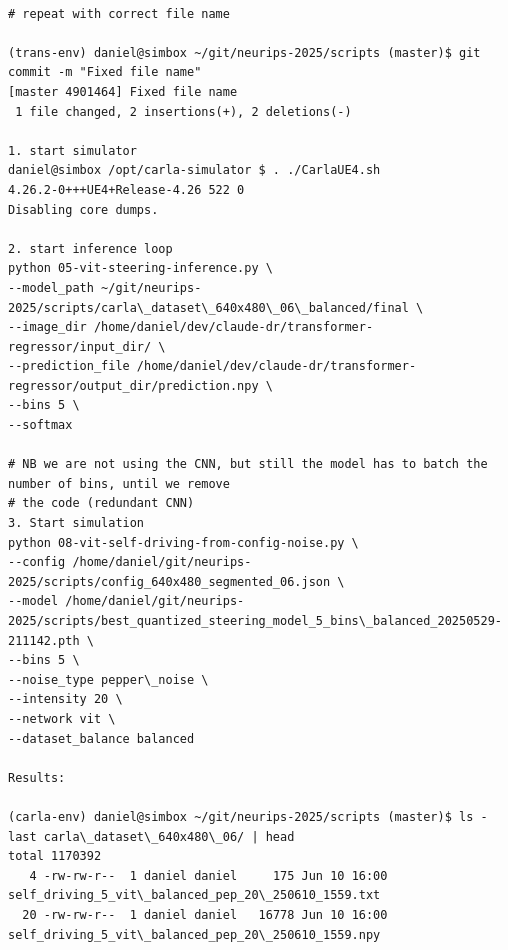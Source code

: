 \begin{verbatim}

# repeat with correct file name

(trans-env) daniel@simbox ~/git/neurips-2025/scripts (master)$ git commit -m "Fixed file name"
[master 4901464] Fixed file name
 1 file changed, 2 insertions(+), 2 deletions(-)
 
1. start simulator
daniel@simbox /opt/carla-simulator $ . ./CarlaUE4.sh 
4.26.2-0+++UE4+Release-4.26 522 0
Disabling core dumps.

2. start inference loop
python 05-vit-steering-inference.py \
--model_path ~/git/neurips-2025/scripts/carla\_dataset\_640x480\_06\_balanced/final \
--image_dir /home/daniel/dev/claude-dr/transformer-regressor/input_dir/ \
--prediction_file /home/daniel/dev/claude-dr/transformer-regressor/output_dir/prediction.npy \
--bins 5 \
--softmax

# NB we are not using the CNN, but still the model has to batch the number of bins, until we remove
# the code (redundant CNN)
3. Start simulation
python 08-vit-self-driving-from-config-noise.py \
--config /home/daniel/git/neurips-2025/scripts/config_640x480_segmented_06.json \
--model /home/daniel/git/neurips-2025/scripts/best_quantized_steering_model_5_bins\_balanced_20250529-211142.pth \
--bins 5 \
--noise_type pepper\_noise \
--intensity 20 \
--network vit \
--dataset_balance balanced

Results:

(carla-env) daniel@simbox ~/git/neurips-2025/scripts (master)$ ls -last carla\_dataset\_640x480\_06/ | head
total 1170392
   4 -rw-rw-r--  1 daniel daniel     175 Jun 10 16:00 self_driving_5_vit\_balanced_pep_20\_250610_1559.txt
  20 -rw-rw-r--  1 daniel daniel   16778 Jun 10 16:00 self_driving_5_vit\_balanced_pep_20\_250610_1559.npy


\end{verbatim}

